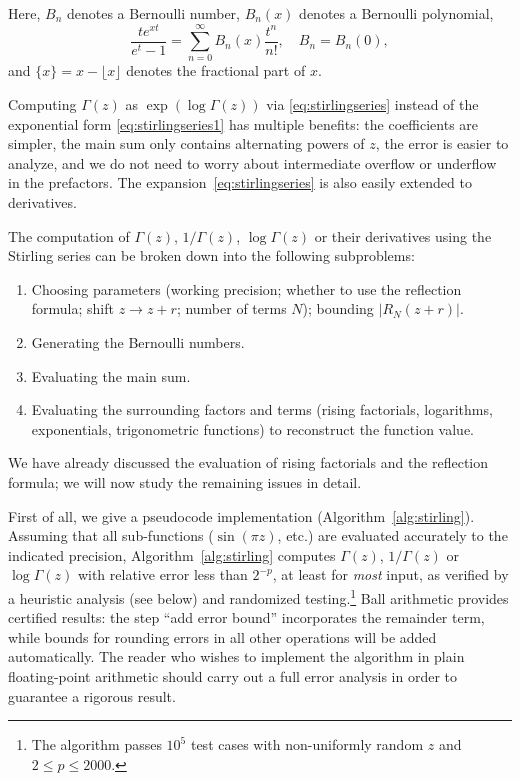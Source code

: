 \documentclass[reqno]{amsart}
\theoremstyle{definition}
\begin{document}
Here, $B_n$ denotes a Bernoulli number, $B_n(x)$ denotes a Bernoulli polynomial,
\begin{equation}
\frac{t e^{xt}}{e^t-1} = \sum_{n=0}^\infty B_n(x) \frac{t^n}{n!}, \quad B_n = B_n(0),
\end{equation}
and $\{x\} = x - \lfloor x \rfloor$ denotes the fractional part of $x$.

Computing $\Gamma(z)$ as $\exp(\log \Gamma(z))$
via \eqref{eq:stirlingseries} instead of
the exponential form \eqref{eq:stirlingseries1} has multiple benefits:
the coefficients are simpler, the main sum only
contains alternating powers of $z$,
the error is easier to analyze,
and we do not need to worry about intermediate overflow or underflow
in the prefactors.
The expansion~\eqref{eq:stirlingseries} is also easily extended
to derivatives.

The computation of $\Gamma(z)$, $1/\Gamma(z)$, $\log \Gamma(z)$ or their derivatives
using the Stirling series can be
broken down into the following subproblems:

\begin{enumerate}
\item Choosing parameters (working precision; whether to use the reflection formula; shift $z \to z + r$; number of terms $N$); bounding $|R_N(z+r)|$.
\item Generating the Bernoulli numbers.
\item Evaluating the main sum.
\item Evaluating the surrounding factors and terms (rising factorials, logarithms, exponentials, trigonometric functions) to reconstruct the function value.
\end{enumerate}

We have already discussed the evaluation of rising factorials
and the reflection formula;
we will now study the remaining issues in detail.

First of all, we give a pseudocode implementation (Algorithm~\ref{alg:stirling}).
Assuming that all sub-functions ($\sin(\pi z)$, etc.) are evaluated accurately
to the indicated precision, Algorithm~\ref{alg:stirling}
computes $\Gamma(z)$, $1/\Gamma(z)$ or $\log \Gamma(z)$
with relative error less than $2^{-p}$, at least for \emph{most} input,
as verified by a heuristic analysis (see below)
and randomized testing.\footnote{The algorithm passes $10^5$ test cases with non-uniformly random $z$ and $2 \le p \le 2000$.}
Ball arithmetic provides certified results: the step
``add error bound'' incorporates the remainder term,
while bounds for rounding errors in all other operations will be
added automatically.
The reader who wishes to implement the algorithm in
plain floating-point arithmetic should carry out
a full error analysis in order to guarantee a rigorous result.
\end{document}
